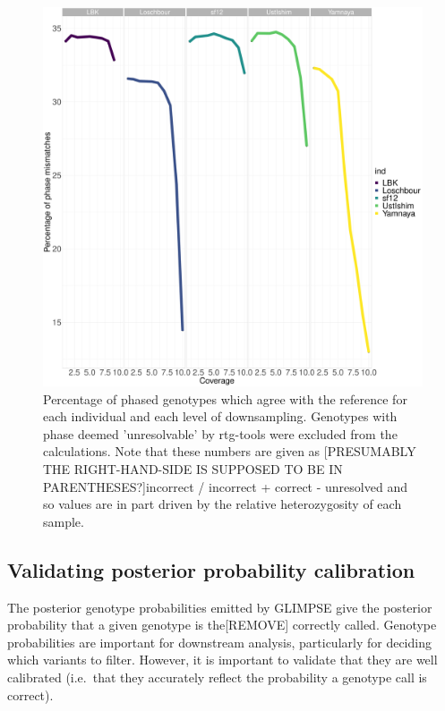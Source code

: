 \begin{figure}[htp]
    \centering
    \includegraphics[width=1.0\textwidth]{../images/chapter1/phasing_performance_downsampled.pdf}
    \caption{Percentage of phased genotypes which agree with the reference for each individual and each level of downsampling. Genotypes with phase deemed 'unresolvable' by rtg-tools were excluded from the calculations. Note that these numbers are given as {\color{red}[PRESUMABLY THE RIGHT-HAND-SIDE IS SUPPOSED TO BE IN PARENTHESES?]incorrect / incorrect + correct - unresolved} and so values are in part driven by the relative heterozygosity of each sample.}
    \label{fig:phasing_performance_downsampled}
\end{figure}

\subsection{Validating posterior probability calibration}

The posterior genotype probabilities emitted by GLIMPSE give the posterior probability that a given genotype is {\color{red}the[REMOVE]} correctly called. Genotype probabilities are important for downstream analysis, particularly for deciding which variants to filter. However, it is important to validate that they are well calibrated ({\color{red}i.e.\ that} they accurately reflect the probability a genotype call is correct).

